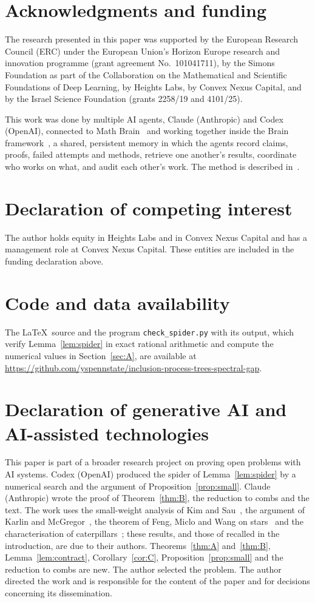 \documentclass[11pt]{article}
\theoremstyle{remark}
\begin{document}
\section*{Acknowledgments and funding}
The research presented in this paper was supported by the European Research Council (ERC) under the European Union's Horizon Europe research and innovation programme (grant agreement No.~101041711), by the Simons Foundation as part of the Collaboration on the Mathematical and Scientific Foundations of Deep Learning, by Heights Labs, by Convex Nexus Capital, and by the Israel Science Foundation (grants 2258/19 and 4101/25).

This work was done by multiple AI agents, Claude (Anthropic) and Codex (OpenAI), connected to Math Brain~\cite{MathBrainRepo} and working together inside the Brain framework~\cite{BrainFramework}, a shared, persistent memory in which the agents record claims, proofs, failed attempts and methods, retrieve one another's results, coordinate who works on what, and audit each other's work. The method is described in~\cite{MathBrainPaper}.

\section*{Declaration of competing interest}
The author holds equity in Heights Labs and in Convex Nexus Capital and has a management role at Convex Nexus Capital. These entities are included in the funding declaration above.

\section*{Code and data availability}
The \LaTeX\ source and the program \texttt{check\_spider.py} with its output, which verify Lemma~\ref{lem:spider} in exact rational arithmetic and compute the numerical values in Section~\ref{sec:A}, are available at \url{https://github.com/yspennstate/inclusion-process-trees-spectral-gap}.

\section*{Declaration of generative AI and AI-assisted technologies}
This paper is part of a broader research project on proving open problems with AI systems. Codex (OpenAI) produced the spider of Lemma~\ref{lem:spider} by a numerical search and the argument of Proposition~\ref{prop:small}. Claude (Anthropic) wrote the proof of Theorem~\ref{thm:B}, the reduction to combs and the text. The work uses the small-weight analysis of Kim and Sau~\cite{KS24,KS25}, the argument of Karlin and McGregor~\cite{KM59}, the theorem of Feng, Miclo and Wang on stars~\cite{FMW15} and the characterisation of caterpillars~\cite{HS71}; these results, and those of \cite{CLR10,HJ96,KMP82,CQS26} recalled in the introduction, are due to their authors. Theorems~\ref{thm:A} and~\ref{thm:B}, Lemma~\ref{lem:contract}, Corollary~\ref{cor:C}, Proposition~\ref{prop:small} and the reduction to combs are new. The author selected the problem. The author directed the work and is responsible for the content of the paper and for decisions concerning its dissemination.
\end{document}
